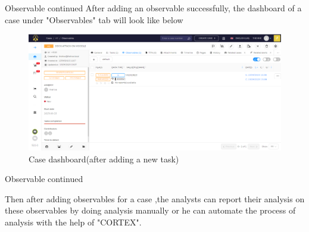 \begin{frame}{Observable continued}
After adding an observable successfully, the dashboard of a case under "Observables" tab will look like below

\begin{figure}[htp]
    \centering
    \includegraphics[scale = 0.28]{case dashboard after adding an observable.png}
    \caption{Case dashboard(after adding a new task)}
    \label{Case dashboard(after adding a new task)}
\end{figure}
    
\end{frame}


\begin{frame}{Observable continued}
\begin{justify}
Then after adding observables for a case ,the analysts can report their analysis on these observables by doing analysis manually or he can automate the process of analysis with the help of "CORTEX". 
\end{justify}

\end{frame}









